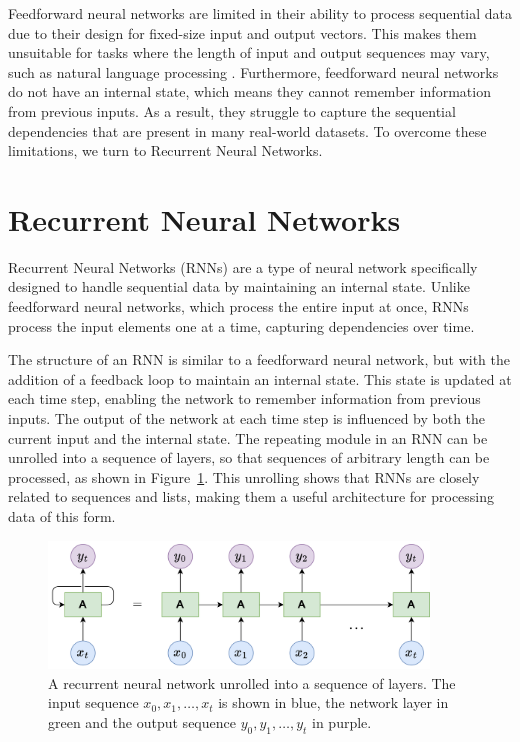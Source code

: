 \documentclass{article}
\newcommand{\reffig}[1]{Figure~\ref{#1}}
\begin{document}
Feedforward neural networks are limited in their ability to process sequential data due to
their design for fixed-size input and output vectors. This makes them unsuitable for tasks
where the length of input and output sequences may vary, such as natural language
processing \cite{Sundermeyer2015}. Furthermore, feedforward neural networks do not have an
internal state, which means they cannot remember information from previous inputs. As a
result, they struggle to capture the sequential dependencies that are present in many
real-world datasets. To overcome these limitations, we turn to Recurrent Neural Networks.



\section{Recurrent Neural Networks}
\label{ch:2}

Recurrent Neural Networks (RNNs) are a type of neural network specifically designed to
handle sequential data by maintaining an internal state. Unlike feedforward neural
networks, which process the entire input at once, RNNs process the input elements one at a
time, capturing dependencies over time.

The structure of an RNN is similar to a feedforward neural network, but with the addition
of a feedback loop to maintain an internal state. This state is updated at each time step,
enabling the network to remember information from previous inputs. The output of the
network at each time step is influenced by both the current input and the internal state.
The repeating module in an RNN can be unrolled into a sequence of layers, so that
sequences of arbitrary length can be processed, as shown in \reffig{fig:rnn-unrolled}.
This unrolling shows that RNNs are closely related to sequences and lists, making them a
useful architecture for processing data of this form.

\begin{figure}[htbp]
  \centering
  \includegraphics[width=0.9\textwidth]{RNN Unrolled.drawio.png}
  \caption{A recurrent neural network unrolled into a sequence of layers. The input
    sequence $x_0, x_1, \ldots, x_t$ is shown in blue, the network layer in green and the
    output sequence $y_0, y_1, \ldots, y_t$ in purple.}
  \label{fig:rnn-unrolled}
\end{figure}
\end{document}
